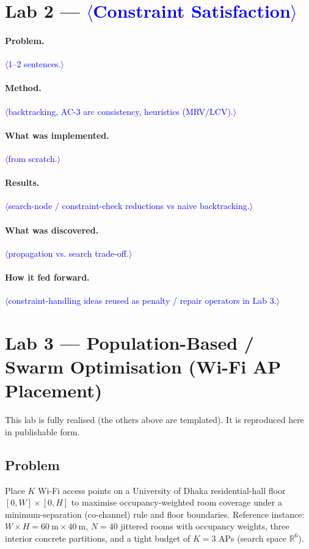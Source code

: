 \documentclass[11pt]{article}
\newcommand{\PH}[1]{\textcolor{blue}{$\langle$#1$\rangle$}}   %
\begin{document}
\section{Lab 2 --- \PH{Constraint Satisfaction}}
\label{sec:lab2}
\paragraph{Problem.} \PH{1--2 sentences.}
\paragraph{Method.} \PH{backtracking, AC-3 arc consistency, heuristics (MRV/LCV).}
\paragraph{What was implemented.} \PH{from scratch.}
\paragraph{Results.} \PH{search-node / constraint-check reductions vs naive backtracking.}
\paragraph{What was discovered.} \PH{propagation vs. search trade-off.}
\paragraph{How it fed forward.} \PH{constraint-handling ideas reused as penalty
/ repair operators in Lab 3.}

\section{Lab 3 --- Population-Based / Swarm Optimisation
        (Wi-Fi AP Placement)}
\label{sec:lab3}
This lab is fully realised (the others above are templated). It is reproduced
here in publishable form.

\subsection{Problem}
Place $K$ Wi-Fi access points on a University of Dhaka residential-hall floor
$[0,W]\times[0,H]$ to maximise occupancy-weighted room coverage under a
minimum-separation (co-channel) rule and floor boundaries. Reference instance:
$W\times H = \SI{60}{\metre}\times\SI{40}{\metre}$, $N=40$ jittered rooms with
occupancy weights, three interior concrete partitions, and a tight budget of
$K=3$ APs (search space $\mathbb{R}^{6}$).
\end{document}
